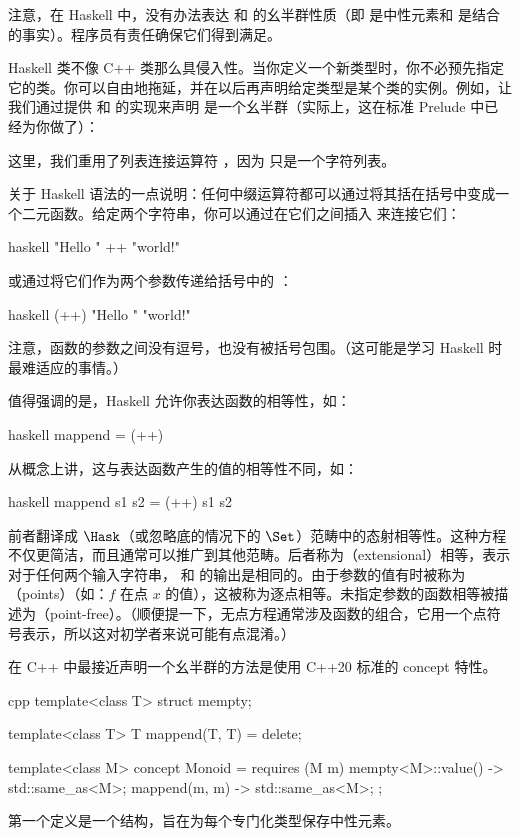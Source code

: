 注意，在 Haskell 中，没有办法表达  和  的幺半群性质（即  是中性元素和  是结合的事实）。程序员有责任确保它们得到满足。

Haskell 类不像 C++ 类那么具侵入性。当你定义一个新类型时，你不必预先指定它的类。你可以自由地拖延，并在以后再声明给定类型是某个类的实例。例如，让我们通过提供  和  的实现来声明  是一个幺半群（实际上，这在标准 Prelude 中已经为你做了）：

这里，我们重用了列表连接运算符 \code{(++)}，因为  只是一个字符列表。

关于 Haskell 语法的一点说明：任何中缀运算符都可以通过将其括在括号中变成一个二元函数。给定两个字符串，你可以通过在它们之间插入 \code{++} 来连接它们：

\begin{snip}{haskell}
  "Hello " ++ "world!"
\end{snip}
或通过将它们作为两个参数传递给括号中的 \code{(++)}：

\begin{snip}{haskell}
(++) "Hello " "world!"
\end{snip}
注意，函数的参数之间没有逗号，也没有被括号包围。（这可能是学习 Haskell 时最难适应的事情。）

值得强调的是，Haskell 允许你表达函数的相等性，如：

\begin{snip}{haskell}
  mappend = (++)
\end{snip}
从概念上讲，这与表达函数产生的值的相等性不同，如：

\begin{snip}{haskell}
  mappend s1 s2 = (++) s1 s2
\end{snip}
前者翻译成 $\Hask$（或忽略底的情况下的 $\Set$）范畴中的态射相等性。这种方程不仅更简洁，而且通常可以推广到其他范畴。后者称为（extensional）相等，表示对于任何两个输入字符串， 和 \code{(++)} 的输出是相同的。由于参数的值有时被称为（points）（如：$f$ 在点 $x$ 的值），这被称为逐点相等。未指定参数的函数相等被描述为（point-free）。（顺便提一下，无点方程通常涉及函数的组合，它用一个点符号表示，所以这对初学者来说可能有点混淆。）

在 C++ 中最接近声明一个幺半群的方法是使用 C++20 标准的 concept 特性。

\begin{snip}{cpp}
  template<class T>
  struct mempty;

  template<class T>
  T mappend(T, T) = delete;

  template<class M>
  concept Monoid = requires (M m) {
      { mempty<M>::value() } -> std::same_as<M>;
      { mappend(m, m) } -> std::same_as<M>;
  };
\end{snip}
第一个定义是一个结构，旨在为每个专门化类型保存中性元素。

